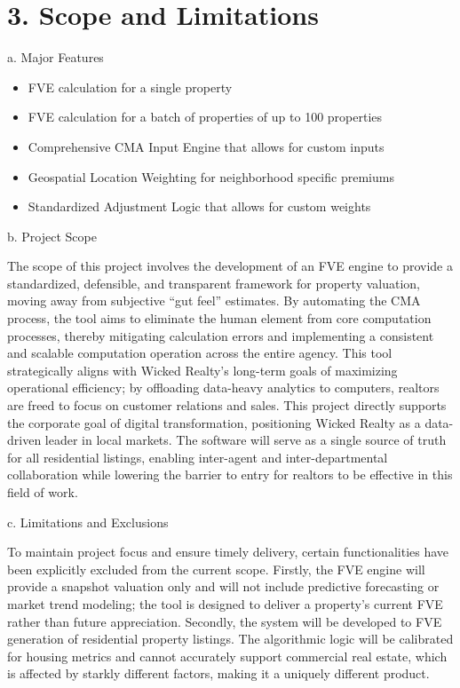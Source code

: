 \documentclass[
]{article}
\begin{document}
\hypertarget{scope-and-limitations}{%
\section{3. Scope and Limitations}\label{scope-and-limitations}}

a. Major Features

\begin{itemize}
\item
  FVE calculation for a single property
\item
  FVE calculation for a batch of properties of up to 100 properties
\item
  Comprehensive CMA Input Engine that allows for custom inputs
\item
  Geospatial Location Weighting for neighborhood specific premiums
\item
  Standardized Adjustment Logic that allows for custom weights
\end{itemize}

b. Project Scope

The scope of this project involves the development of an FVE engine to
provide a standardized, defensible, and transparent framework for
property valuation, moving away from subjective ``gut feel'' estimates.
By automating the CMA process, the tool aims to eliminate the human
element from core computation processes, thereby mitigating calculation
errors and implementing a consistent and scalable computation operation
across the entire agency. This tool strategically aligns with Wicked
Realty's long-term goals of maximizing operational efficiency; by
offloading data-heavy analytics to computers, realtors are freed to
focus on customer relations and sales. This project directly supports
the corporate goal of digital transformation, positioning Wicked Realty
as a data-driven leader in local markets. The software will serve as a
single source of truth for all residential listings, enabling
inter-agent and inter-departmental collaboration while lowering the
barrier to entry for realtors to be effective in this field of work.

c. Limitations and Exclusions

To maintain project focus and ensure timely delivery, certain
functionalities have been explicitly excluded from the current scope.
Firstly, the FVE engine will provide a snapshot valuation only and will
not include predictive forecasting or market trend modeling; the tool is
designed to deliver a property's current FVE rather than future
appreciation. Secondly, the system will be developed to FVE generation
of residential property listings. The algorithmic logic will be
calibrated for housing metrics and cannot accurately support commercial
real estate, which is affected by starkly different factors, making it a
uniquely different product.
\end{document}

